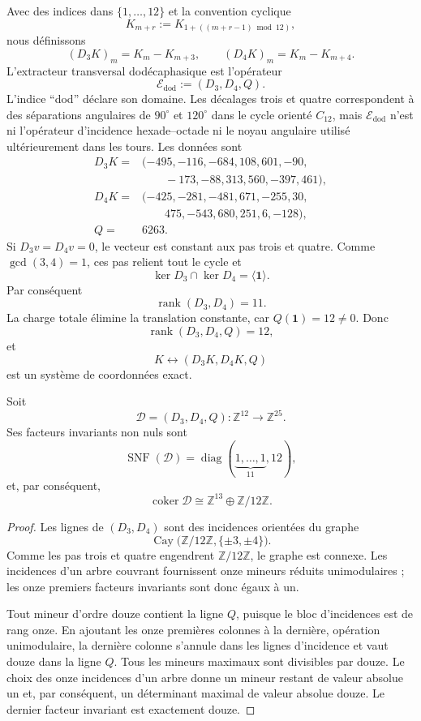 Avec des indices dans \(\{1,\ldots,12\}\) et la convention cyclique
\[
 K_{m+r}:=K_{1+((m+r-1)\bmod12)},
\]
nous définissons
\[
(D_3K)_m=K_m-K_{m+3},
\qquad
(D_4K)_m=K_m-K_{m+4}.
\]
L'extracteur transversal dodécaphasique est l'opérateur
\[
 \mathcal E_{\mathrm{dod}}
 :=(D_3,D_4,Q).
\]
L'indice ``dod'' déclare son domaine. Les décalages trois et quatre
correspondent à des séparations angulaires de \(90^\circ\) et \(120^\circ\) dans le
cycle orienté \(C_{12}\), mais \(\mathcal E_{\mathrm{dod}}\) n'est ni l'opérateur
d'incidence hexade--octade ni le noyau angulaire utilisé ultérieurement dans
les tours.
Les données sont
\[
\begin{aligned}
D_3K={}&(-495,-116,-684,108,601,-90,\\
       &\qquad-173,-88,313,560,-397,461),\\[1mm]
D_4K={}&(-425,-281,-481,671,-255,30,\\
       &\qquad475,-543,680,251,6,-128),\\[1mm]
Q={}&6263.
\end{aligned}
\]
Si \(D_3v=D_4v=0\), le vecteur est constant aux pas trois et quatre. Comme
\(\gcd(3,4)=1\), ces pas relient tout le cycle et
\[
\ker D_3\cap\ker D_4=\langle\mathbf1\rangle.
\]
Par conséquent
\[
\operatorname{rank}(D_3,D_4)=11.
\]
La charge totale élimine la translation constante, car
\(Q(\mathbf1)=12\ne0\). Donc
\[
\boxed{\operatorname{rank}(D_3,D_4,Q)=12,}
\]
et
\[
K\longleftrightarrow(D_3K,D_4K,Q)
\]
est un système de coordonnées exact.

\begin{theorem}
\label{thm:smith-dodecafase}
Soit
\[
 \mathcal D=(D_3,D_4,Q):
 \mathbb Z^{12}\longrightarrow\mathbb Z^{25}.
\]
Ses facteurs invariants non nuls sont
\[
 \operatorname{SNF}(\mathcal D)
 =\operatorname{diag}(\underbrace{1,\ldots,1}_{11},12),
\]
et, par conséquent,
\[
 \operatorname{coker}\mathcal D
 \cong\mathbb Z^{13}\oplus\mathbb Z/12\mathbb Z.
\]
\end{theorem}

\begin{proof}
Les lignes de \((D_3,D_4)\) sont des incidences orientées du graphe
\[
 \operatorname{Cay}
 \bigl(\mathbb Z/12\mathbb Z,\{\pm3,\pm4\}\bigr).
\]
Comme les pas trois et quatre engendrent \(\mathbb Z/12\mathbb Z\), le graphe
est connexe.
Les incidences d'un arbre couvrant fournissent onze mineurs réduits
unimodulaires ; les onze premiers facteurs invariants sont donc égaux à
un.

Tout mineur d'ordre douze contient la ligne \(Q\), puisque le bloc
d'incidences est de rang onze. En ajoutant les onze premières colonnes à la
dernière, opération unimodulaire, la dernière colonne s'annule dans les lignes
d'incidence et vaut douze dans la ligne \(Q\). Tous les mineurs maximaux sont
divisibles par douze. Le choix des onze incidences d'un arbre donne un
mineur restant de valeur absolue un et, par conséquent, un déterminant maximal
de valeur absolue douze. Le dernier facteur invariant est exactement douze.
\end{proof}

